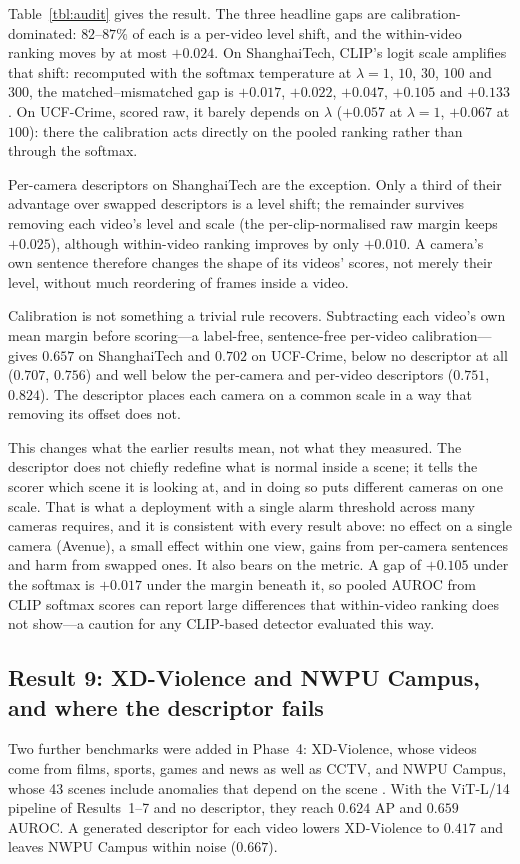 \documentclass[a4paper,fleqn]{cas-sc}
\begin{document}
Table~\ref{tbl:audit} gives the result. The three headline gaps are
calibration-dominated: $82$--$87\%$ of each is a per-video level shift, and the
within-video ranking moves by at most $+0.024$. On ShanghaiTech, CLIP's logit
scale amplifies that shift: recomputed with the softmax temperature at
$\lambda{=}1$, $10$, $30$, $100$ and $300$, the matched--mismatched gap is
$+0.017$, $+0.022$, $+0.047$, $+0.105$ and $+0.133$. On UCF-Crime, scored raw,
it barely depends on $\lambda$ ($+0.057$ at $\lambda{=}1$, $+0.067$ at $100$):
there the calibration acts directly on the pooled ranking rather than through
the softmax.

Per-camera descriptors on ShanghaiTech are the exception. Only a third of their
advantage over swapped descriptors is a level shift; the remainder survives
removing each video's level and scale (the per-clip-normalised raw margin keeps
$+0.025$), although within-video ranking improves by only $+0.010$. A camera's
own sentence therefore changes the shape of its videos' scores, not merely their
level, without much reordering of frames inside a video.

Calibration is not something a trivial rule recovers. Subtracting each video's
own mean margin before scoring---a label-free, sentence-free per-video
calibration---gives $0.657$ on ShanghaiTech and $0.702$ on UCF-Crime, below no
descriptor at all ($0.707$, $0.756$) and well below the per-camera and
per-video descriptors ($0.751$, $0.824$). The descriptor places each camera on a
common scale in a way that removing its offset does not.

This changes what the earlier results mean, not what they measured. The
descriptor does not chiefly redefine what is normal inside a scene; it tells the
scorer which scene it is looking at, and in doing so puts different cameras on
one scale. That is what a deployment with a single alarm threshold across many
cameras requires, and it is consistent with every result above: no effect on a
single camera (Avenue), a small effect within one view, gains from per-camera
sentences and harm from swapped ones. It also bears on the metric. A gap of
$+0.105$ under the softmax is $+0.017$ under the margin beneath it, so pooled
AUROC from CLIP softmax scores can report large differences that within-video
ranking does not show---a caution for any CLIP-based detector evaluated this way.

\subsection{Result 9: XD-Violence and NWPU Campus, and where the descriptor fails}
\label{sec:res-xd}
Two further benchmarks were added in Phase~4: XD-Violence, whose videos come from
films, sports, games and news as well as CCTV, and NWPU Campus, whose 43 scenes
include anomalies that depend on the scene \citep{wu2020xdviolence, cao2023nwpu}.
With the ViT-L/14 pipeline of Results~1--7 and no descriptor, they reach $0.624$ AP
and $0.659$ AUROC. A generated descriptor for each video lowers XD-Violence to
$0.417$ and leaves NWPU Campus within noise ($0.667$).
\end{document}

